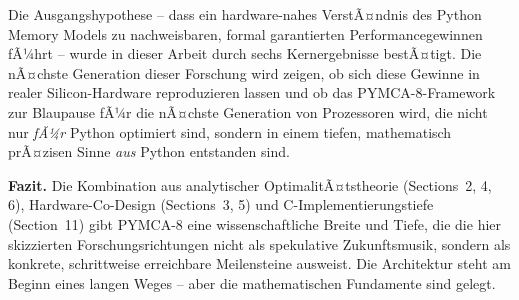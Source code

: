 ﻿\documentclass[a4paper,12pt]{scrreprt}
\theoremstyle{definition}
\begin{document}
	Die Ausgangshypothese -- dass ein hardware-nahes VerstÃ¤ndnis des Python
	Memory Models zu nachweisbaren, formal garantierten Performancegewinnen fÃ¼hrt
	-- wurde in dieser Arbeit durch sechs Kernergebnisse bestÃ¤tigt.
	Die nÃ¤chste Generation dieser Forschung wird zeigen, ob sich diese Gewinne
	in realer Silicon-Hardware reproduzieren lassen und ob das PYMCA-8-Framework
	zur Blaupause fÃ¼r die nÃ¤chste Generation von Prozessoren wird, die nicht
	nur \emph{fÃ¼r} Python optimiert sind, sondern in einem tiefen, mathematisch
	prÃ¤zisen Sinne \emph{aus} Python entstanden sind.

	\medskip
	\textbf{Fazit.} Die Kombination aus analytischer OptimalitÃ¤tstheorie
	(Sections~2, 4, 6), Hardware-Co-Design (Sections~3, 5) und C-Implementierungstiefe
	(Section~11) gibt PYMCA-8 eine wissenschaftliche Breite und Tiefe, die die
	hier skizzierten Forschungsrichtungen nicht als spekulative Zukunftsmusik,
	sondern als konkrete, schrittweise erreichbare Meilensteine ausweist.
	Die Architektur steht am Beginn eines langen Weges -- aber die mathematischen
	Fundamente sind gelegt.
	
\end{document}
